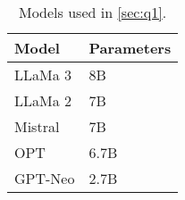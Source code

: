 \begin{table}[ht]
\centering
\begin{tabular}{ll}
  \toprule
  \textbf{Model} & \textbf{Parameters} \\
  \midrule
  \multirow{1}{*}{LLaMa 3} \citep{dubey2024llama3herdmodels} & 8B \\
  \multirow{1}{*}{LLaMa 2 \citep{touvron2023llama}} & 7B \\
  Mistral \citep{jiang2023mistral7b} & 7B \\
  OPT \citep{zhang2022opt} & 6.7B \\
\multirow{1}{*}{GPT-Neo \citep{gpt-neo}} & 2.7B \\
  \bottomrule
\end{tabular}
\caption{Models used in \autoref{sec:q1}. \label{table:models}}
\end{table}
